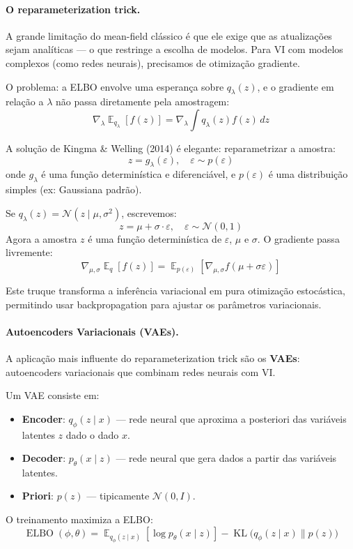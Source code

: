 \documentclass{tufte-handout}
\DeclareMathOperator{\E}{\mathbb{E}}
\DeclareMathOperator{\KL}{KL}
\DeclareMathOperator{\ELBO}{ELBO}
\begin{document}
\paragraph{O reparameterization trick.}

A grande limitação do mean-field clássico é que ele exige que as atualizações sejam
analíticas --- o que restringe a escolha de modelos. Para VI com modelos complexos
(como redes neurais), precisamos de otimização gradiente.

O problema: a ELBO envolve uma esperança sobre $q_\lambda(z)$, e o gradiente em
relação a $\lambda$ não passa diretamente pela amostragem:
\[
\nabla_\lambda \E_{q_\lambda}[f(z)] = \nabla_\lambda \int q_\lambda(z) f(z) \, dz
\]

A solução de Kingma \& Welling (2014) é elegante: reparametrizar a amostra:
\[
z = g_\lambda(\varepsilon), \quad \varepsilon \sim p(\varepsilon)
\]
onde $g_\lambda$ é uma função determinística e diferenciável, e $p(\varepsilon)$
é uma distribuição simples (ex: Gaussiana padrão).

\begin{exmp}
    Se $q_\lambda(z) = \mathcal{N}(z \mid \mu, \sigma^2)$, escrevemos:
    \[
    z = \mu + \sigma \cdot \varepsilon, \quad \varepsilon \sim \mathcal{N}(0, 1)
    \]
    Agora a amostra $z$ é uma função determinística de $\varepsilon$, $\mu$ e
    $\sigma$. O gradiente passa livremente:
    \[
    \nabla_{\mu, \sigma} \E_{q} [f(z)] = \E_{p(\varepsilon)}[\nabla_{\mu, \sigma} f(\mu + \sigma \varepsilon)]
    \]
\end{exmp}

Este truque transforma a inferência variacional em pura otimização estocástica,
permitindo usar backpropagation para ajustar os parâmetros variacionais.

\paragraph{Autoencoders Variacionais (VAEs).}

A aplicação mais influente do reparameterization trick são os \textbf{VAEs}:
autoencoders variacionais que combinam redes neurais com VI.

\begin{defn}[VAE]
    Um VAE consiste em:
    \begin{itemize}
        \item \textbf{Encoder}: $q_\phi(z \mid x)$ --- rede neural que aproxima a
        posteriori das variáveis latentes $z$ dado o dado $x$.
        \item \textbf{Decoder}: $p_\theta(x \mid z)$ --- rede neural que gera dados
        a partir das variáveis latentes.
        \item \textbf{Priori}: $p(z)$ --- tipicamente $\mathcal{N}(0, I)$.
    \end{itemize}
    O treinamento maximiza a ELBO:
    \[
    \ELBO(\phi, \theta) = \E_{q_\phi(z \mid x)}[\log p_\theta(x \mid z)]
    - \KL\big(q_\phi(z \mid x) \parallel p(z)\big)
    \]
\end{defn}
\end{document}
